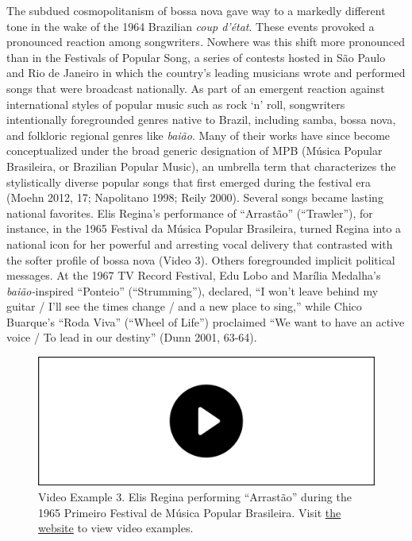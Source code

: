 \documentclass[twoside]{article}
\providecommand{\wmturlcaption}{
  Visit \href{https://worldmusictextbook.org/mcnally-2021}{the website} to view video examples.
}
\begin{document}
The subdued cosmopolitanism of bossa nova gave way to a markedly
different tone in the wake of the 1964 Brazilian \emph{coup d'état}.
These events provoked a pronounced reaction among songwriters\emph{.}
Nowhere was this shift more pronounced than in the Festivals of Popular
Song, a series of contests hosted in São Paulo and Rio de Janeiro in
which the country's leading musicians wrote and performed songs that
were broadcast nationally. As part of an emergent reaction against
international styles of popular music such as rock `n' roll, songwriters
intentionally foregrounded genres native to Brazil, including samba,
bossa nova, and folkloric regional genres like \emph{baião}. Many of
their works have since become conceptualized under the broad generic
designation of MPB (Música Popular Brasileira, or Brazilian Popular
Music), an umbrella term that characterizes the stylistically diverse
popular songs that first emerged during the festival era (Moehn 2012,
17; Napolitano 1998; Reily 2000). Several songs became lasting national
favorites. Elis Regina's performance of ``Arrastão'' (``Trawler''), for
instance, in the 1965 Festival da Música Popular Brasileira, turned
Regina into a national icon for her powerful and arresting vocal
delivery that contrasted with the softer profile of bossa nova (Video
3). Others foregrounded implicit political messages. At the 1967 TV
Record Festival, Edu Lobo and Marília Medalha's \emph{baião-}inspired
``Ponteio'' (``Strumming''), declared, ``I won't leave behind my guitar
/ I'll see the times change / and a new place to sing,'' while Chico
Buarque's ``Roda Viva'' (``Wheel of Life'') proclaimed ``We want to have
an active voice / To lead in our destiny'' (Dunn 2001, 63-64).

\begin{figure}
  \includegraphics[width=\textwidth]{../play-video.png}
  \caption*{Video Example 3. Elis Regina performing ``Arrastão'' during the 1965
  Primeiro Festival de Música Popular Brasileira. \wmturlcaption}
\end{figure}
\end{document}
